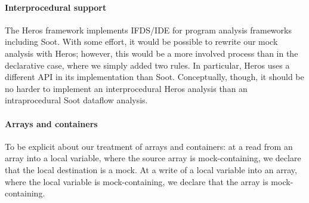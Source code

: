 

\paragraph{Interprocedural support} The Heros framework\cite{bodden12:_inter_proced_data_flow_analy} implements IFDS/IDE for program analysis frameworks including Soot. With some effort, it would be possible to rewrite our mock analysis with Heros; however, this would be a more involved process than in the declarative case, where we simply added two rules. In particular, Heros uses a different API in its implementation than Soot. Conceptually, though, it should be no harder to implement an interprocedural Heros analysis than an intraprocedural Soot dataflow analysis.

\paragraph{Arrays and containers} To be explicit about our treatment of arrays and containers: at a read from an array into a local variable, where the source array is mock-containing, we declare that the local destination is a mock. At a write of a local variable into an array, where the local variable is mock-containing, we declare that the array is mock-containing.




